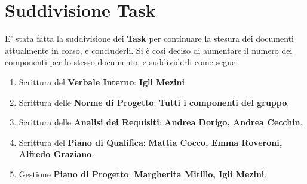 	\section{Suddivisione Task}
E' stata fatta la suddivisione dei \textbf{Task} per continuare la stesura dei documenti attualmente in corso, e concluderli.
	Si è così deciso di aumentare il numero dei componenti per lo stesso documento, e suddividerli come segue:
	\begin{enumerate}
		\item Scrittura del \textbf{Verbale Interno}: \textbf{Igli Mezini}
		\item Scrittura delle \textbf{Norme di Progetto}: \textbf{Tutti i componenti del gruppo}.
		\item Scrittura delle \textbf{Analisi dei Requisiti}: \textbf{Andrea Dorigo, Andrea Cecchin}.
		\item Scrittura del \textbf{Piano di Qualifica}: \textbf{Mattia Cocco, Emma Roveroni, Alfredo Graziano}.
		\item Gestione \textbf{Piano di Progetto}: \textbf{Margherita Mitillo, Igli Mezini}.
	\end{enumerate}